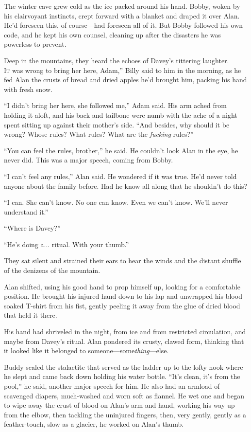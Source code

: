 The winter cave grew cold as the ice packed around his hand.  Bobby,
woken by his clairvoyant instincts, crept forward with a blanket and
draped it over Alan.  He'd foreseen this, of course---had foreseen all
of it.  But Bobby followed his own code, and he kept his own counsel,
cleaning up after the disasters he was powerless to prevent.

Deep in the mountains, they heard the echoes of Davey's tittering
laughter.
\\
\lettrine[lines=3, lhang=.5, nindent=0pt, findent=2pt]{I}{t} 
was wrong to bring her here, Adam,'' Billy said to him in the
morning, as he fed Alan the crusts of bread and dried apples he'd
brought him, packing his hand with fresh snow.

``I didn't bring her here, she followed me,'' Adam said.  His arm
ached from holding it aloft, and his back and tailbone were numb with
the ache of a night spent sitting up against their mother's side. 
``And besides, why should it be wrong?  Whose rules?  What rules? 
What are the \textit{fucking} rules?''

``You can feel the rules, brother,'' he said.  He couldn't look Alan
in the eye, he never did.  This was a major speech, coming from Bobby.

``I can't feel any rules,'' Alan said.  He wondered if it was true. 
He'd never told anyone about the family before.  Had he know all along
that he shouldn't do this?

``I can.  She can't know.  No one can know.  Even we can't know. 
We'll never understand it.''

``Where is Davey?''

``He's doing a...  ritual.  With your thumb.''

They sat silent and strained their ears to hear the winds and the
distant shuffle of the denizens of the mountain.

Alan shifted, using his good hand to prop himself up, looking for a
comfortable position.  He brought his injured hand down to his lap and
unwrapped his blood-soaked T-shirt from his fist, gently peeling it
away from the glue of dried blood that held it there.

His hand had shriveled in the night, from ice and from restricted
circulation, and maybe from Davey's ritual.  Alan pondered its crusty,
clawed form, thinking that it looked like it belonged to
someone---some\textit{thing}---else.

Buddy scaled the stalactite that served as the ladder up to the lofty
nook where he slept and came back down holding his water bottle. 
``It's clean, it's from the pool,'' he said, another major speech for
him.  He also had an armload of scavenged diapers, much-washed and
worn soft as flannel.  He wet one and began to wipe away the crust of
blood on Alan's arm and hand, working his way up from the elbow, then
tackling the uninjured fingers, then, very gently, gently as a
feather-touch, slow as a glacier, he worked on Alan's thumb.

